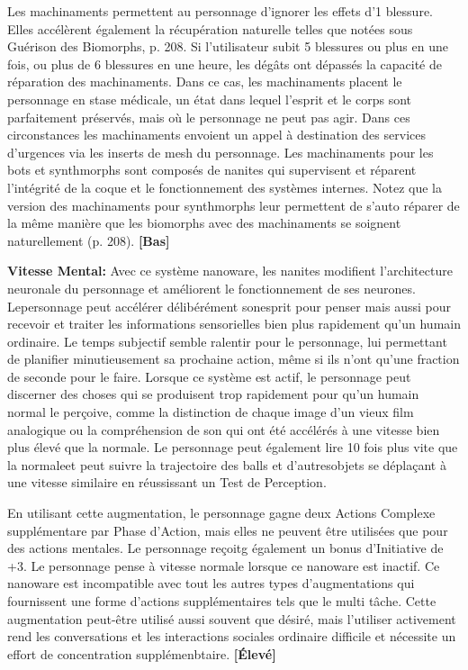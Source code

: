 Les machinaments permettent au personnage d'ignorer les effets d'1 blessure. Elles accélèrent également la récupération naturelle telles que notées sous Guérison des Biomorphs, p. 208. Si l'utilisateur subit 5 blessures ou plus en une fois, ou plus de 6 blessures en une heure, les dégâts ont dépassés la capacité de réparation des machinaments. Dans ce cas, les machinaments placent le personnage en stase médicale, un état dans lequel l'esprit et le corps sont parfaitement préservés, mais où le personnage ne peut pas agir. Dans ces circonstances les machinaments envoient un appel à destination des services d'urgences via les inserts de mesh du personnage. Les machinaments pour les bots et synthmorphs sont composés de nanites qui supervisent et réparent l'intégrité de la coque et le fonctionnement des systèmes internes. Notez que la version des machinaments pour synthmorphs leur permettent de s'auto réparer de la même manière que les biomorphs avec des machinaments se soignent naturellement (p. 208). \textbf{[Bas]} 

\textbf{Vitesse Mental:} Avec ce système nanoware, les nanites modifient l'architecture neuronale du personnage et améliorent le fonctionnement de ses neurones. Lepersonnage peut accélérer délibérément sonesprit pour penser mais aussi pour recevoir et traiter les informations sensorielles bien plus rapidement qu'un humain ordinaire. Le temps subjectif semble ralentir pour le personnage, lui permettant de planifier minutieusement sa prochaine action, même si ils n'ont qu'une fraction de seconde pour le faire. Lorsque ce système est actif, le personnage peut discerner des choses qui se produisent trop rapidement pour qu'un humain normal le perçoive, comme la distinction de chaque image d'un vieux film analogique ou la compréhension de son qui ont été accélérés à une vitesse bien plus élevé que la normale. Le personnage peut également lire 10 fois plus vite que la normaleet peut suivre la trajectoire des balls et d'autresobjets se déplaçant à une vitesse similaire en réussissant un Test de Perception. 

En utilisant cette augmentation, le personnage gagne deux Actions Complexe supplémentare par Phase d'Action, mais elles ne peuvent être utilisées que pour des actions mentales. Le personnage reçoitg également un bonus d'Initiative de +3. Le personnage pense à vitesse normale lorsque ce nanoware est inactif. Ce nanoware est incompatible avec tout les autres types d'augmentations qui fournissent une forme d'actions supplémentaires tels que le multi tâche. Cette augmentation peut-être utilisé aussi souvent que désiré, mais l'utiliser activement rend les conversations et les interactions sociales ordinaire difficile et nécessite un effort de concentration supplémenbtaire. \textbf{[Élevé]} 

